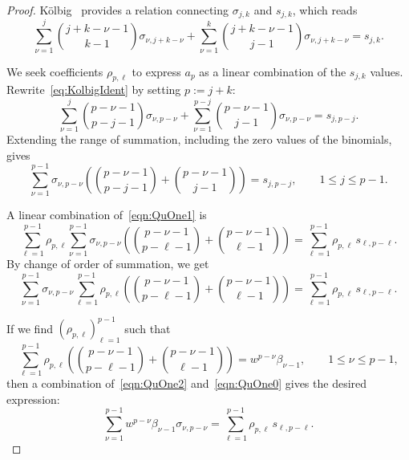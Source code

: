\documentclass[10pt,reqno,a4paper]{amsart}%
\theoremstyle{definition}
\begin{document}
\begin{proof}
K\"olbig~\cite[Theorem 3]{Kolbig} provides a relation connecting $\sigma
_{j,k}$ and $s_{j,k}$, which reads
\begin{equation}
\label{eq:KolbigIdent}\sum_{\nu=1}^{j}\binom{j+k-\nu-1}{k-1}\sigma
_{\nu,j+k-\nu} +\sum_{\nu=1}^{k}\binom{j+k-\nu-1}{j-1}\sigma_{\nu,j+k-\nu}
=s_{j,k}.
\end{equation}


We seek coefficients $\rho_{p,\ell}$ to express $a_{p}$ as a linear
combination of the $s_{j,k}$ values. Rewrite~\eqref{eq:KolbigIdent} by setting
$p:=j+k$:
\[
\sum_{\nu=1}^{j}\binom{p-\nu-1}{p-j-1}\sigma_{\nu,p-\nu} +\sum_{\nu=1}%
^{p-j}\binom{p-\nu-1}{j-1}\sigma_{\nu,p-\nu} =s_{j,p-j}.
\]
Extending the range of summation, including the zero values of the binomials,
gives
\begin{equation}
\sum_{\nu=1}^{p-1}\sigma_{\nu,p-\nu} \left(  \binom{p-\nu-1}{p-j-1}%
+\binom{p-\nu-1}{j-1} \right)  =s_{j,p-j},\qquad1\le j\le p-1.
\label{eqn:QuOne1}%
\end{equation}


A linear combination of~\eqref{eqn:QuOne1} is
\[
\sum_{\ell=1}^{p-1}\rho_{p,\ell} \sum_{\nu=1}^{p-1}\sigma_{\nu,p-\nu} \left(
\binom{p-\nu-1}{p-\ell-1}+\binom{p-\nu-1}{\ell-1} \right)  = \sum_{\ell
=1}^{p-1}\rho_{p,\ell}\,s_{\ell,p-\ell}.
\]
By change of order of summation, we get
\[
\sum_{\nu=1}^{p-1}\sigma_{\nu,p-\nu} \sum_{\ell=1}^{p-1}\rho_{p,\ell} \left(
\binom{p-\nu-1}{p-\ell-1}+\binom{p-\nu-1}{\ell-1} \right)  = \sum_{\ell
=1}^{p-1}\rho_{p,\ell}\,s_{\ell,p-\ell}.
\]


If we find $(\rho_{p,\ell})_{\ell=1}^{p-1}$ such that
\begin{equation}
\sum_{\ell=1}^{p-1}\rho_{p,\ell} \left(  \binom{p-\nu-1}{p-\ell-1}%
+\binom{p-\nu-1}{\ell-1} \right)  = w^{p-\nu}\beta_{\nu-1}, \qquad1\le\nu\le
p-1, \label{eqn:QuOne2}%
\end{equation}
then a combination of~\eqref{eqn:QuOne2} and~\eqref{eqn:QuOne0} gives the
desired expression:
\[
\sum_{\nu=1}^{p-1}w^{p-\nu}\beta_{\nu-1}\sigma_{\nu,p-\nu} = \sum_{\ell
=1}^{p-1}\rho_{p,\ell}\,s_{\ell,p-\ell}.
\]



\end{proof}
\end{document}
